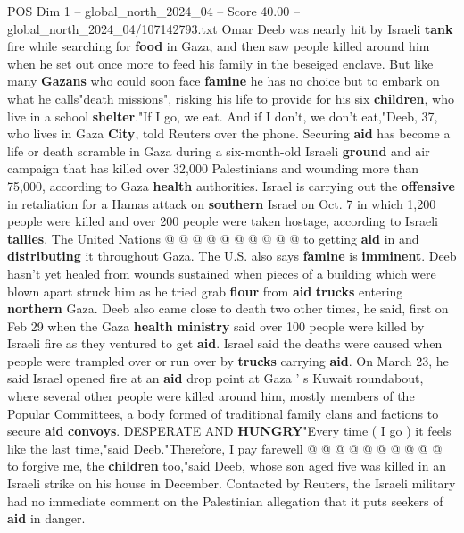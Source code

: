 \begin{textsample}{POS Dim 1 – global\_north\_2024\_04 – Score 40.00 – global\_north\_2024\_04/107142793.txt}  \label{ex:f1_pos_196}
Omar Deeb was nearly hit by Israeli \textbf{tank} fire while searching for \textbf{food} in Gaza, and then saw people killed around him when he set out once more to feed his family in the beseiged enclave.
But like many \textbf{Gazans} who could soon face \textbf{famine} he has no choice but to embark on what he calls"death missions", risking his life to provide for his six \textbf{children}, who live in a school \textbf{shelter}."If I go, we eat.
And if I don't, we don't eat,"Deeb, 37, who lives in Gaza \textbf{City}, told Reuters over the phone.
Securing \textbf{aid} has become a life or death scramble in Gaza during a six-month-old Israeli \textbf{ground} and air campaign that has killed over 32,000 Palestinians and wounding more than 75,000, according to Gaza \textbf{health} authorities.
Israel is carrying out the \textbf{offensive} in retaliation for a Hamas attack on \textbf{southern} Israel on Oct. 7 in which 1,200 people were killed and over 200 people were taken hostage, according to Israeli \textbf{tallies}.
The United Nations @ @ @ @ @ @ @ @ @ @ to getting \textbf{aid} in and \textbf{distributing} it throughout Gaza.
The U.S. also says \textbf{famine} is \textbf{imminent}.
Deeb hasn't yet healed from wounds sustained when pieces of a building which were blown apart struck him as he tried grab \textbf{flour} from \textbf{aid} \textbf{trucks} entering \textbf{northern} Gaza.
Deeb also came close to death two other times, he said, first on Feb 29 when the Gaza \textbf{health} \textbf{ministry} said over 100 people were killed by Israeli fire as they ventured to get \textbf{aid}.
Israel said the deaths were caused when people were trampled over or run over by \textbf{trucks} carrying \textbf{aid}.
On March 23, he said Israel opened fire at an \textbf{aid} drop point at Gaza ' s Kuwait roundabout, where several other people were killed around him, mostly members of the Popular Committees, a body formed of traditional family clans and factions to secure \textbf{aid} \textbf{convoys}.
DESPERATE AND \textbf{HUNGRY}"Every time ( I go ) it feels like the last time,"said Deeb."Therefore, I pay farewell @ @ @ @ @ @ @ @ @ @ to forgive me, the \textbf{children} too,"said Deeb, whose son aged five was killed in an Israeli strike on his house in December.
Contacted by Reuters, the Israeli military had no immediate comment on the Palestinian allegation that it puts seekers of \textbf{aid} in danger.

\end{textsample}
